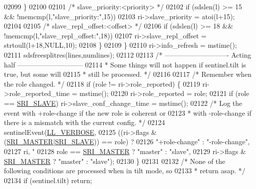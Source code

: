 \begin{DoxyCode}
{{{{{{{{{{{{{{{{{{{{{{{{{{{{{{{{{{{{{{{{{02099             \}
02100 
02101             \textcolor{comment}{/* slave\_priority:<priority> */}
02102             \textcolor{keywordflow}{if} (sdslen(l) >= 15 && !memcmp(l,\textcolor{stringliteral}{"slave\_priority:"},15))
02103                 ri->slave\_priority = atoi(l+15);
02104 
02105             \textcolor{comment}{/* slave\_repl\_offset:<offset> */}
02106             \textcolor{keywordflow}{if} (sdslen(l) >= 18 && !memcmp(l,\textcolor{stringliteral}{"slave\_repl\_offset:"},18))
02107                 ri->slave\_repl\_offset = strtoull(l+18,NULL,10);
02108         \}
02109     \}
02110     ri->info\_refresh = mstime();
02111     sdsfreesplitres(lines,numlines);
02112 
02113     \textcolor{comment}{/* ---------------------------- Acting half -----------------------------}
02114 \textcolor{comment}{     * Some things will not happen if sentinel.tilt is true, but some will}
02115 \textcolor{comment}{     * still be processed. */}
02116 
02117     \textcolor{comment}{/* Remember when the role changed. */}
02118     \textcolor{keywordflow}{if} (role != ri->role\_reported) \{
02119         ri->role\_reported\_time = mstime();
02120         ri->role\_reported = role;
02121         \textcolor{keywordflow}{if} (role == \hyperlink{sentinel_8c_a4b9db21eda79d49bd9fdf2cf7b3178e8}{SRI\_SLAVE}) ri->slave\_conf\_change\_time = mstime();
02122         \textcolor{comment}{/* Log the event with +role-change if the new role is coherent or}
02123 \textcolor{comment}{         * with -role-change if there is a mismatch with the current config. */}
02124         sentinelEvent(\hyperlink{server_8h_a479b60032f8da6d8ad72e1a9d0809950}{LL\_VERBOSE},
02125             ((ri->flags & (\hyperlink{sentinel_8c_a2ee83e5ff67b45746cd6a310f15334b2}{SRI\_MASTER}|\hyperlink{sentinel_8c_a4b9db21eda79d49bd9fdf2cf7b3178e8}{SRI\_SLAVE})) == role) ?
02126             \textcolor{stringliteral}{"+role-change"} : \textcolor{stringliteral}{"-role-change"},
02127             ri, \textcolor{stringliteral}{"%
02128             role == \hyperlink{sentinel_8c_a2ee83e5ff67b45746cd6a310f15334b2}{SRI\_MASTER} ? \textcolor{stringliteral}{"master"} : \textcolor{stringliteral}{"slave"},
02129             ri->flags & \hyperlink{sentinel_8c_a2ee83e5ff67b45746cd6a310f15334b2}{SRI\_MASTER} ? \textcolor{stringliteral}{"master"} : \textcolor{stringliteral}{"slave"});
02130     \}
02131 
02132     \textcolor{comment}{/* None of the following conditions are processed when in tilt mode, so}
02133 \textcolor{comment}{     * return asap. */}
02134     \textcolor{keywordflow}{if} (sentinel.tilt) \textcolor{keywordflow}{return};
}}}}}}}}}}}}}}}}}}}}}}}}}}}}}}}}}}}}}}}}}}
\end{DoxyCode}
